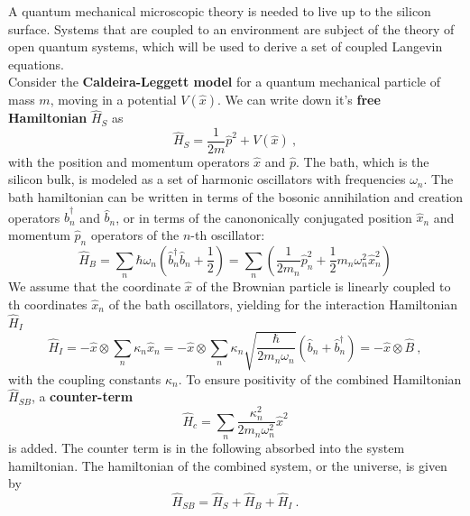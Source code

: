 	A quantum mechanical microscopic theory is needed to live up to the silicon surface. Systems that are coupled to an environment are subject of the theory of open quantum systems, which will be used to derive a set of coupled Langevin equations. \\
	
	Consider the \textbf{Caldeira-Leggett model} \cite{caldeira1981influence} for a quantum mechanical particle of mass $m$, moving in a potential $V(\hat{x})$. We can write down it's \textbf{free Hamiltonian} $\hat{H}_S$ as 
	\begin{equation}
		\hat{H}_S =	\frac{1}{2m} \hat{p}^2 + V(\hat{x})~,
	\end{equation}   
	with the position and momentum operators $\hat{x}$ and $\hat{p}$. The bath, which is the silicon bulk, is modeled as a set of harmonic oscillators with frequencies $\omega_n$. The bath hamiltonian can be written in terms of the bosonic annihilation and creation operators $\hat{b}_n^\dagger$ and $\hat{b}_n$, or in terms of the canononically conjugated position $\hat{x}_n$ and momentum $\hat{p}_n$ operators of the $n$-th oscillator:
	\begin{equation}
		\hat{H}_B =	\sum_n \hbar \omega_n \left(\hat{b}_n^\dagger \hat{b}_n + \frac{1}{2} \right) =	\sum_n \left(\frac{1}{2 m_n} \hat{p}_n^2 + \frac{1}{2} m_n \omega_n^2 \hat{x}_n^2 \right)
	\end{equation}
	We assume that the coordinate $\hat{x}$ of the Brownian particle is linearly coupled to th coordinates $\hat{x}_n$ of the bath oscillators, yielding for the interaction Hamiltonian $\hat{H}_I$
	\begin{equation}
		\hat{H}_I =	- \hat{x} \otimes \sum_n \kappa_n \hat{x}_n =	-\hat{x} \otimes \sum_n \kappa_n \sqrt{\frac{\hbar}{2 m_n \omega_n}} \left(\hat{b}_n + \hat{b}_n^\dagger\right) =	- \hat{x} \otimes \hat{B} ~,
	\end{equation}
	with the coupling constants $\kappa_n$. To ensure positivity of the combined Hamiltonian $\hat{H}_{SB}$, a \textbf{counter-term}
	\begin{equation}
		\hat{H}_c =	\sum_n \frac{\kappa_n^2}{2 m_n \omega_n^2} \hat{x}^2 
	\end{equation}
	is added. The counter term is in the following absorbed into the system hamiltonian. The hamiltonian of the combined system, or the universe, is given by
	\begin{equation}
		\hat{H}_{SB} = \hat{H}_S + \hat{H}_B + \hat{H}_I~.
	\end{equation}
